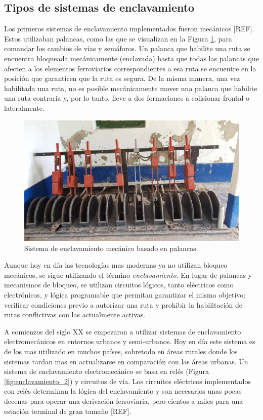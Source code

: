 \subsection{Tipos de sistemas de enclavamiento}

    Los primeros sistemas de enclavamiento implementados fueron mecánicos [REF]. Estos utilizaban palancas, como las que se visualizan en la Figura \ref{fig:enclavamiento_1}, para comandar los cambios de vías y semáforos. Un palanca que habilite una ruta se encuentra bloqueada mecánicamente (enclavada) hasta que todas las palancas que afecten a los elementos ferroviarios correspondientes a esa ruta se encuentre en la posición que garanticen que la ruta es segura. De la misma manera, una vez habilitada una ruta, no es posible mecánicamente mover una palanca que habilite una ruta contraria y, por lo tanto, lleve a dos formaciones a colisionar frontal o lateralmente.
    
        \begin{figure}[H]
            \centering
            \includegraphics[width=1\textwidth]{Figuras/palancas.jpg}
            \centering\caption{Sistema de enclavamiento mecánico basado en palancas.}
            \label{fig:enclavamiento_1}
        \end{figure}

    Aunque hoy en día las tecnologías mas modernas ya no utilizan bloqueo mecánicos, se sigue utilizando el término \textit{enclavamiento}. En lugar de palancas y mecanismos de bloqueo, se utilizan circuitos lógicos, tanto eléctricos como electrónicos, y lógica programable que permitan garantizar el mismo objetivo: verificar condiciones previo a autorizar una ruta y prohibir la habilitación de rutas conflictivas con las actualmente activas.

    A comienzos del siglo XX se empezaron a utilizar sistemas de enclavamiento electromecánicos en entornos urbanos y semi-urbanos. Hoy en día este sistema es de los mas utilizado en muchos países, sobretodo en áreas rurales donde los sistemas tardan mas en actualizarse en comparación con las áreas urbanas. Un sistema de enclavamiento electromecánico se basa en relés (Figura \ref{fig:enclavamiento_2}) y circuitos de vía. Los circuitos eléctricos implementados con relés determinan la lógica del enclavamiento y son necesarios unas pocas decenas para operar una derivación ferroviaria, pero cientos a miles para una estación terminal de gran tamaño [REF].

